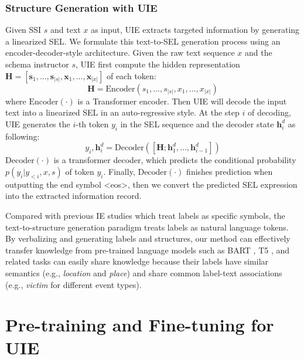 \documentclass[11pt]{article}
\begin{document}
\subsubsection{Structure Generation with UIE}
Given SSI $s$ and text $x$ as input, UIE extracts targeted information by generating a linearized SEL.
We formulate this text-to-SEL generation process using an encoder-decoder-style architecture.
Given the raw text sequence $x$ and the schema instructor $s$, UIE first compute the hidden representation $\mathbf{H} = [\mathbf{s}_{1}, ..., \mathbf{s}_{|s|}, \mathbf{x}_{1}, ..., \mathbf{x}_{|x|}]$ of each token:
\begin{equation} \label{equ:encoder}
    \mathbf{H} = \text{Encoder}(s_{1}, ..., s_{|s|}, x_{1}, ..., x_{|x|})
\end{equation}
where $\text{Encoder}(\cdot)$ is a Transformer encoder.
Then UIE will decode the input text into a linearized SEL in an auto-regressive style.
At the step $i$ of decoding, UIE generates the $i$-th token $y_{i}$ in the SEL sequence and the decoder state $\mathbf{h}_{i}^{d}$ as following:
\begin{equation} \label{equ:decoder}
    y_{i}, \mathbf{h}_{i}^{d} = \text{Decoder}([\mathbf{H}; \mathbf{h}_{1}^{d}, ..., \mathbf{h}_{i-1}^{d}])
\end{equation}
$\text{Decoder}(\cdot)$ is a transformer decoder, which predicts the conditional probability $p(y_{i} | y_{<i}, x, s)$ of token $y_{i}$.
Finally, $\text{Decoder}(\cdot)$ finishes prediction when outputting the end symbol <eos>, then we convert the predicted SEL expression into the extracted information record.

Compared with previous IE studies which treat labels as specific symbols, the text-to-structure generation paradigm treats labels as natural language tokens.
By verbalizing and generating  labels and structures, our method can effectively transfer knowledge from pre-trained language models such as BART \citep{lewis-etal-2020-bart}, T5 \citep{2020t5}, and related tasks can easily share knowledge because their labels have similar semantics (e.g., \textit{location} and \textit{place}) and share common label-text associations (e.g., \textit{victim} for different event types).
 
\section{Pre-training and Fine-tuning for UIE} \label{sec:learning}
\end{document}
